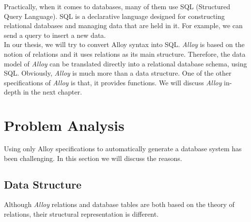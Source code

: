 \documentclass[oneside]{book}
\begin{document}
Practically, when it comes to databases, many of them use SQL (Structured Query Language). SQL is a declarative language designed for constructing relational databases and managing data that are held in it. For example, we can send a query to insert a new data.\\

In our thesis, we will try to convert Alloy syntax into SQL. \textit{Alloy} is based on the notion of relations and it uses relations as its main structure. Therefore, the data model of \textit{Alloy} can be translated directly into a relational database schema, using SQL. Obviously, \textit{Alloy} is much more than a data structure. One of the other specifications of \textit{Alloy} is that, it provides functions. We will discuss \textit{Alloy} in-depth in the next chapter.

\newpage

\section{Problem Analysis}

Using only Alloy specifications to automatically generate a database system has been challenging. In this section we will discuss the reasons. 

\subsection{Data Structure}

Although \textit{Alloy} relations and database tables are both based on the theory of relations, their structural representation is different.\\
\end{document}
